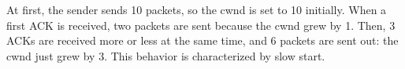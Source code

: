 At first, the sender sends 10 packets, so the cwnd is set to 10 initially. When a first ACK is received, two packets are sent because the cwnd grew by 1. Then, 3 ACKs are received more or less at the same time, and 6 packets are sent out: the cwnd just grew by 3. This behavior is characterized by slow start.